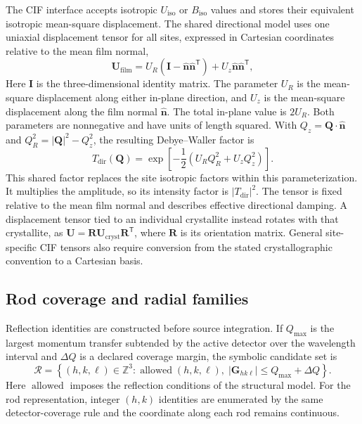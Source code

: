 The CIF interface accepts isotropic $U_{\mathrm{iso}}$ or $B_{\mathrm{iso}}$ values and stores their equivalent isotropic mean-square displacement. The shared directional model uses one uniaxial displacement tensor for all sites, expressed in Cartesian coordinates relative to the mean film normal,
\begin{equation}
\mathbf U_{\mathrm{film}}
=U_R\left(\mathbf I-\hat{\mathbf n}\hat{\mathbf n}^{\mathsf T}\right)
+U_z\hat{\mathbf n}\hat{\mathbf n}^{\mathsf T},
\label{eq:si_shared_uniaxial_u}
\end{equation}
Here $\mathbf I$ is the three-dimensional identity matrix. The parameter $U_R$ is the mean-square displacement along either in-plane direction, and $U_z$ is the mean-square displacement along the film normal $\hat{\mathbf n}$. The total in-plane value is $2U_R$. Both parameters are nonnegative and have units of length squared. With $Q_z=\mathbf Q\cdot\hat{\mathbf n}$ and $Q_R^2=|\mathbf Q|^2-Q_z^2$, the resulting Debye--Waller factor is
\begin{equation}
T_{\mathrm{dir}}(\mathbf Q)
=\exp\!\left[-\frac12\left(U_RQ_R^2+U_zQ_z^2\right)\right].
\label{eq:si_shared_uniaxial_factor}
\end{equation}
This shared factor replaces the site isotropic factors within this parameterization. It multiplies the amplitude, so its intensity factor is $|T_{\mathrm{dir}}|^2$. The tensor is fixed relative to the mean film normal and describes effective directional damping. A displacement tensor tied to an individual crystallite instead rotates with that crystallite, as $\mathbf U=\mathbf R\mathbf U_{\mathrm{cryst}}\mathbf R^{\mathsf T}$, where $\mathbf R$ is its orientation matrix. General site-specific CIF tensors also require conversion from the stated crystallographic convention to a Cartesian basis.\cite{Trueblood1996}

\subsection{Rod coverage and radial families}

Reflection identities are constructed before source integration. If $Q_{\max}$ is the largest momentum transfer subtended by the active detector over the wavelength interval and $\Delta Q$ is a declared coverage margin, the symbolic candidate set is
\begin{equation}
\mathcal R=
\left\{(h,k,\ell)\in\mathbb Z^3:
\operatorname{allowed}(h,k,\ell),\;
|\mathbf G_{hk\ell}|\leq Q_{\max}+\Delta Q
\right\}.
\label{eq:si_reflection_candidate_set}
\end{equation}
Here $\operatorname{allowed}$ imposes the reflection conditions of the structural model. For the rod representation, integer $(h,k)$ identities are enumerated by the same detector-coverage rule and the coordinate along each rod remains continuous.

